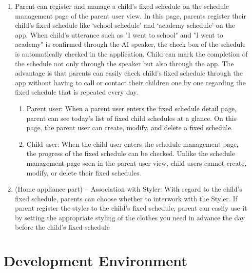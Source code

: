 \documentclass[conference]{IEEEtran}
\begin{document}
\begin{enumerate}
  \item Parent can register and manage a child's fixed schedule on the schedule management page of the parent user view. In this page, parents register their child's fixed schedule like ‘school schedule’ and ‘academy schedule’ on the app. When child's utterance such as "I went to school" and "I went to academy" is confirmed through the AI speaker, the check box of the schedule is automatically checked in the application. Child can mark the completion of the schedule not only through the speaker but also through the app. The advantage is that parents can easily check child’s fixed schedule through the app without having to call or contact their children one by one regarding the fixed schedule that is repeated every day.
  \begin{enumerate}
    \item Parent user: When a parent user enters the fixed schedule detail page, parent can see today's list of fixed child schedules at a glance. On this page, the parent user can create, modify, and delete a fixed schedule.
    \item Child user: When the child user enters the schedule management page, the progress of the fixed schedule can be checked. Unlike the schedule management page seen in the parent user view, child users cannot create, modify, or delete their fixed schedules.
  \end{enumerate}
  \item (Home appliance part) – Association with Styler: With regard to the child's fixed schedule, parents can choose whether to interwork with the Styler. If parent register the styler to the child’s fixed schedule, parent can easily use it by setting the appropriate styling of the clothes you need in advance the day before the child’s fixed schedule
\end{enumerate}

\section{Development Environment}
\end{document}

